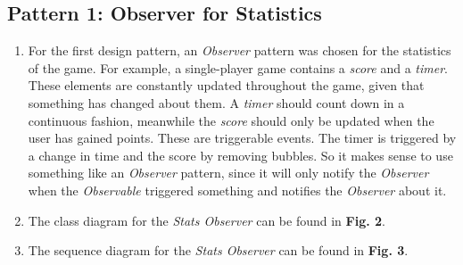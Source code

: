 \documentclass[a4paper,11pt]{article}
\begin{document}
\subsection{Pattern 1: Observer for Statistics}
\begin{enumerate}
\item For the first design pattern, an \textit{Observer} pattern was chosen for the statistics of the game. For example, a single-player game contains a \textit{score} and a \textit{timer}. These elements are constantly updated throughout the game, given that something has changed about them. A \textit{timer} should count down in a continuous fashion, meanwhile the \textit{score} should only be updated when the user has gained points. These are triggerable events.
The timer is triggered by a change in time and the score by removing bubbles. So it makes sense to use something like an \textit{Observer} pattern, since it will only notify the \textit{Observer} when the \textit{Observable} triggered something and notifies the \textit{Observer} about it.

\item The class diagram for the \textit{Stats Observer} can be found in \textbf{Fig. 2}.
\begin{minipage}{\linewidth}
\end{minipage}
\item The sequence diagram for the \textit{Stats Observer} can be found in \textbf{Fig. 3}.
\begin{minipage}{\linewidth}
\end{minipage}
\end{enumerate}
\end{document}
